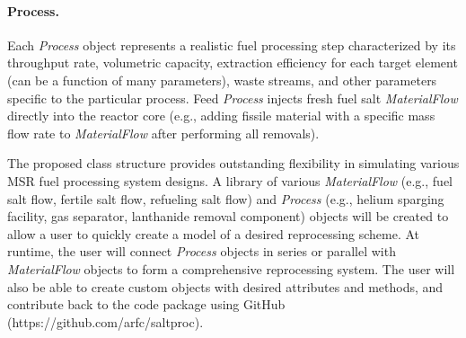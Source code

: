 \paragraph{Process.}Each \textit{Process} object represents a 
realistic fuel processing step characterized by its throughput rate, 
volumetric capacity, extraction efficiency for each target element (can be 
a function of many parameters), waste streams, and other parameters specific 
to the particular process. Feed	\textit{Process} injects fresh fuel salt 
\textit{MaterialFlow} directly into the reactor core (e.g., adding fissile 
material with a specific mass flow rate to \textit{MaterialFlow} after 
performing all removals).

The proposed class structure provides outstanding flexibility in simulating 
various \gls{MSR} fuel processing system designs. A library of various  
\textit{MaterialFlow} (e.g., fuel salt flow, fertile salt flow, refueling salt 
flow) and \textit{Process} (e.g., helium sparging facility, gas separator, 
lanthanide removal component) objects will be created to allow a user to 
quickly create a model of a desired reprocessing scheme. At runtime, the user 
will connect \textit{Process} objects in series or parallel with 
\textit{MaterialFlow} objects to form a comprehensive reprocessing system. The 
user will also be able to create custom objects with desired attributes and 
methods, and contribute back to the code package using GitHub 
(https://github.com/arfc/saltproc).	

